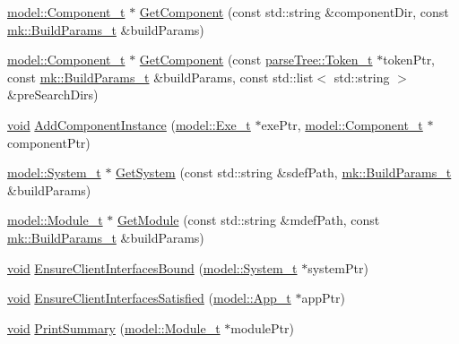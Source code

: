 \begin{DoxyCompactItemize}
\item 
\hyperlink{structmodel_1_1_component__t}{model\+::\+Component\+\_\+t} $\ast$ \hyperlink{namespacemodeller_af01297a355ef606eac9bd6088442cfb6}{Get\+Component} (const std\+::string \&component\+Dir, const \hyperlink{structmk_1_1_build_params__t}{mk\+::\+Build\+Params\+\_\+t} \&build\+Params)
\item 
\hyperlink{structmodel_1_1_component__t}{model\+::\+Component\+\_\+t} $\ast$ \hyperlink{namespacemodeller_aeed6160764cd8a6dd4bf71f303a2e999}{Get\+Component} (const \hyperlink{structparse_tree_1_1_token__t}{parse\+Tree\+::\+Token\+\_\+t} $\ast$token\+Ptr, const \hyperlink{structmk_1_1_build_params__t}{mk\+::\+Build\+Params\+\_\+t} \&build\+Params, const std\+::list$<$ std\+::string $>$ \&pre\+Search\+Dirs)
\item 
\hyperlink{_t_e_m_p_l_a_t_e__cdef_8h_ac9c84fa68bbad002983e35ce3663c686}{void} \hyperlink{namespacemodeller_a851f055c5222b6510e622c196629efc3}{Add\+Component\+Instance} (\hyperlink{structmodel_1_1_exe__t}{model\+::\+Exe\+\_\+t} $\ast$exe\+Ptr, \hyperlink{structmodel_1_1_component__t}{model\+::\+Component\+\_\+t} $\ast$component\+Ptr)
\item 
\hyperlink{structmodel_1_1_system__t}{model\+::\+System\+\_\+t} $\ast$ \hyperlink{namespacemodeller_aacd07f6c6a05f5081b3274b872e5e1f5}{Get\+System} (const std\+::string \&sdef\+Path, \hyperlink{structmk_1_1_build_params__t}{mk\+::\+Build\+Params\+\_\+t} \&build\+Params)
\item 
\hyperlink{structmodel_1_1_module__t}{model\+::\+Module\+\_\+t} $\ast$ \hyperlink{namespacemodeller_a2715fd89e87a7fee2386a6fbe8668cfe}{Get\+Module} (const std\+::string \&mdef\+Path, const \hyperlink{structmk_1_1_build_params__t}{mk\+::\+Build\+Params\+\_\+t} \&build\+Params)
\item 
\hyperlink{_t_e_m_p_l_a_t_e__cdef_8h_ac9c84fa68bbad002983e35ce3663c686}{void} \hyperlink{namespacemodeller_ab8c5146576a36f7819ec12729e8b8613}{Ensure\+Client\+Interfaces\+Bound} (\hyperlink{structmodel_1_1_system__t}{model\+::\+System\+\_\+t} $\ast$system\+Ptr)
\item 
\hyperlink{_t_e_m_p_l_a_t_e__cdef_8h_ac9c84fa68bbad002983e35ce3663c686}{void} \hyperlink{namespacemodeller_ac346b8fd6bfdbc6c8287119a75705afc}{Ensure\+Client\+Interfaces\+Satisfied} (\hyperlink{structmodel_1_1_app__t}{model\+::\+App\+\_\+t} $\ast$app\+Ptr)
\item 
\hyperlink{_t_e_m_p_l_a_t_e__cdef_8h_ac9c84fa68bbad002983e35ce3663c686}{void} \hyperlink{namespacemodeller_a239f6a23694b9504322dc866f83ed500}{Print\+Summary} (\hyperlink{structmodel_1_1_module__t}{model\+::\+Module\+\_\+t} $\ast$module\+Ptr)

\end{DoxyCompactItemize}
